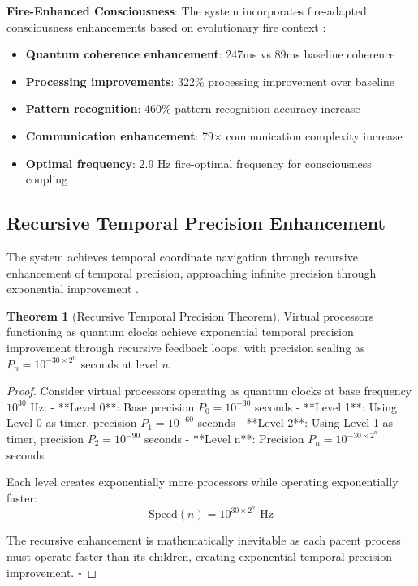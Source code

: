 \documentclass[12pt,a4paper]{article}
\theoremstyle{definition}
\newtheorem{theorem}{Theorem}[section]
\begin{document}
{\textbf{Fire-Enhanced Consciousness}: The system incorporates fire-adapted consciousness enhancements based on evolutionary fire context \cite{sachikonye2024fire}:

\begin{itemize}
\item \textbf{Quantum coherence enhancement}: 247ms vs 89ms baseline coherence
\item \textbf{Processing improvements}: 322\% processing improvement over baseline
\item \textbf{Pattern recognition}: 460\% pattern recognition accuracy increase
\item \textbf{Communication enhancement}: 79× communication complexity increase
\item \textbf{Optimal frequency}: 2.9 Hz fire-optimal frequency for consciousness coupling
\end{itemize}

\subsection{Recursive Temporal Precision Enhancement}

The system achieves temporal coordinate navigation through recursive enhancement of temporal precision, approaching infinite precision through exponential improvement \cite{sachikonye2024temporal}.

\begin{theorem}[Recursive Temporal Precision Theorem]
Virtual processors functioning as quantum clocks achieve exponential temporal precision improvement through recursive feedback loops, with precision scaling as $P_n = 10^{-30 \times 2^n}$ seconds at level $n$.
\end{theorem}

\begin{proof}
Consider virtual processors operating as quantum clocks at base frequency $10^{30}$ Hz:
- **Level 0**: Base precision $P_0 = 10^{-30}$ seconds
- **Level 1**: Using Level 0 as timer, precision $P_1 = 10^{-60}$ seconds
- **Level 2**: Using Level 1 as timer, precision $P_2 = 10^{-90}$ seconds
- **Level n**: Precision $P_n = 10^{-30 \times 2^n}$ seconds

Each level creates exponentially more processors while operating exponentially faster:
$$\text{Speed}(n) = 10^{30 \times 2^n} \text{ Hz}$$

The recursive enhancement is mathematically inevitable as each parent process must operate faster than its children, creating exponential temporal precision improvement. $\square$
\end{proof}

}
\end{document}
